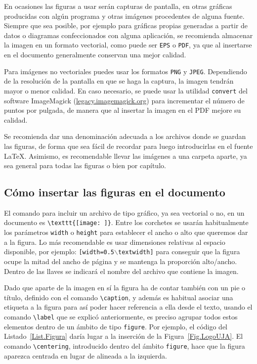 En ocasiones las figuras a usar serán capturas de pantalla, en otras gráficas producidas con algún programa y otras imágenes procedentes de alguna fuente. Siempre que sea posible, por ejemplo para gráficas propias generadas a partir de datos o diagramas confeccionados con alguna aplicación, se recomienda almacenar la imagen en un formato vectorial, como puede ser \texttt{EPS} o \texttt{PDF}, ya que al insertarse en el documento generalmente conservan una mejor calidad.

Para imágenes no vectoriales puedes usar los formatos \texttt{PNG} y \texttt{JPEG}. Dependiendo de la resolución de la pantalla en que se haga la captura, la imagen tendrán mayor o menor calidad. En caso necesario, se puede usar la utilidad \texttt{convert} del software ImageMagick (\url{legacy.imagemagick.org}) para incrementar el número de puntos por pulgada, de manera que al insertar la imagen en el PDF mejore su calidad.

Se recomienda dar una denominación adecuada a los archivos donde se guardan las figuras, de forma que sea fácil de recordar para luego introducirlas en el fuente \LaTeX. Asimismo, es recomendable llevar las imágenes a una carpeta aparte, ya sea general para todas las figuras o bien por capítulo.

\subsection{Cómo insertar las figuras en el documento}

El comando para incluir un archivo de tipo gráfico, ya sea vectorial o no, en un documento es \verb|\texttt{[image: ]}|. Entre los corchetes se usarán habitualmente los parámetros \texttt{width} o \texttt{height} para establecer el ancho o alto que queremos dar a la figura. Lo más recomendable es usar dimensiones relativas al espacio disponible, por ejemplo: \texttt{[width=0.5$\backslash$textwidth]} para conseguir que la figura ocupe la mitad del ancho de página y se mantenga la proporción alto/ancho. Dentro de las llaves se indicará el nombre del archivo que contiene la imagen.

Dado que aparte de la imagen en sí la figura ha de contar también con un pie o título, definido con el comando \verb|\caption|, y además es habitual asociar una etiqueta a la figura para así poder hacer referencia a ella desde el texto, usando el comando \verb|\label| que se explicó anteriormente, es preciso agrupar todos estos elementos dentro de un ámbito de tipo \texttt{figure}. Por ejemplo, el código del Listado~\ref{List.Figura} daría lugar a la inserción de la Figura~\ref{Fig.LogoUJA}. El comando \verb|\centering|, introducido dentro del ámbito \texttt{figure}, hace que la figura aparezca centrada en lugar de alineada a la izquierda.


